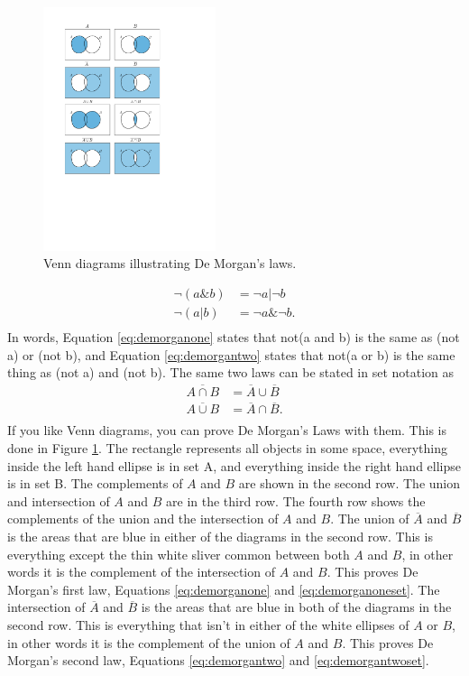 \documentclass[../physical_computing.tex]{subfiles}
\begin{document}
\begin{figure}[h!]
    \centering
    \includegraphics[width=0.45\textwidth]{chapter_1/figures/venn_diagram_figure.pdf}
    \caption{\label{fig:venn_diagram_figure} Venn diagrams illustrating De Morgan's laws.}
\end{figure}

\begin{align}
\neg(a\&b) &= \neg a | \neg b
\label{eq:demorganone} \\
\neg(a|b)&=\neg a \& \neg b.
\label{eq:demorgantwo} \\
\nonumber
\end{align}
In words, Equation \ref{eq:demorganone} states that not(a and b) is the same as (not a) or (not b), and Equation \ref{eq:demorgantwo} states that not(a or b) is the same thing as (not a) and (not b). The same two laws can be stated in set notation as
\begin{align}
    \overline{A\cap B}&=\overline{A}\cup\overline{B}
    \label{eq:demorganoneset} \\
    \overline{A\cup B}&=\overline{A}\cap\overline{B}.
    \label{eq:demorgantwoset} \\ \nonumber
\end{align}
If you like Venn diagrams, you can prove De Morgan's Laws with them. This is done in Figure \ref{fig:venn_diagram_figure}. The rectangle represents all objects in some space, everything inside the left hand ellipse is in set A, and everything inside the right hand ellipse is in set B. The complements of $A$ and $B$ are shown in the second row. The union and intersection of $A$ and $B$ are in the third row. The fourth row shows the complements of the union and the intersection of $A$ and $B$. The union of $\overline{A}$ and $\overline{B}$ is the areas that are blue in either of the diagrams in the second row. This is everything except the thin white sliver common between both $A$ and $B$, in other words it is the complement of the intersection of $A$ and $B$. This proves De Morgan's first law, Equations \ref{eq:demorganone} and \ref{eq:demorganoneset}. The intersection of $\overline{A}$ and $\overline{B}$ is the areas that are blue in both of the diagrams in the second row. This is everything that isn't in either of the white ellipses of $A$ or $B$, in other words it is the complement of the union of $A$ and $B$. This proves De Morgan's second law, Equations \ref{eq:demorgantwo} and \ref{eq:demorgantwoset}.
\end{document}
